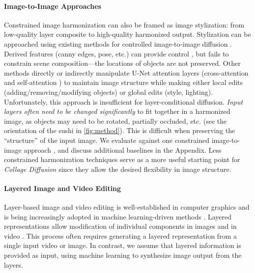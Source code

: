 \paragraph{Image-to-Image Approaches} \label{related:img2img}
Constrained image harmonization can also be framed as image stylization: from low-quality layer composite to high-quality harmonized output. 
Stylization can be approached using existing methods for controlled image-to-image diffusion \cite{prompt2prompt,brooks2022instructpix2pix,tumanyan2022plug,mokady2022null,zhang2023adding}. 
Derived features (canny edges, pose, etc.) can provide control \cite{zhang2023adding}, but fails to constrain scene composition---the locations of objects are not preserved. 
Other methods directly \cite{prompt2prompt, tumanyan2022plug,mokady2022null} or indirectly \cite{brooks2022instructpix2pix} manipulate U-Net attention layers (cross-attention \cite{prompt2prompt,brooks2022instructpix2pix,mokady2022null} and self-attention \cite{tumanyan2022plug}) to maintain image structure while making either local edits (adding/removing/modifying objects) or global edits (style, lighting). 
Unfortunately, this approach is insufficient for layer-conditional diffusion.
\emph{Input layers often need to be changed significantly} to fit together in a harmonized image, as objects may need to be rotated, partially occluded, etc. (see the orientation of the sushi in \cref{fig:method}).
This is difficult when preserving the ``structure'' of the input image. 
We evaluate against one constrained image-to-image approach \cite{tumanyan2022plug}, and discuss additional baselines in the Appendix. 
Less constrained harmonization techniques \cite{sdedit} serve as a more useful starting point for \textit{Collage Diffusion} since they allow the desired flexibility in image structure. 
\vspace{-1.5em}

\paragraph{Layered Image and Video Editing}
Layer-based image and video editing is well-established in computer graphics \cite{porter1984compositing,wang1994representing} and is being increasingly adopted in machine learning-driven methods \cite{bar2022text2live, latentPrior, kasten2021layered, lu2020layered}. 
Layered representations allow modification of individual components in images \cite{bar2022text2live, latentPrior} and in video \cite{bar2022text2live, kasten2021layered, lu2020layered}.
This process often requires generating a layered representation from a single input video or image.
In contrast, we assume that layered information is provided as input, using machine learning to synthesize image output from the layers. 
